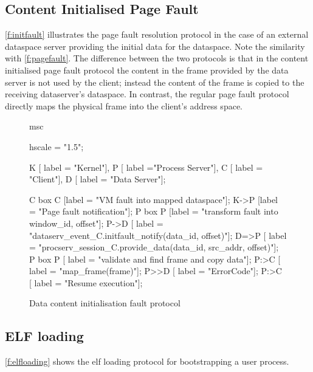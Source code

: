 \clearpage
\subsection{Content Initialised Page Fault}

\autoref{f:initfault} illustrates the page fault resolution protocol in the case of an external dataspace server providing the initial data for the dataspace. Note the similarity with \autoref{f:pagefault}. The difference between the two protocols is that in the content initialised page fault protocol the content in the frame provided by the data server is not used by the client; instead the content of the frame is copied to the receiving dataserver's dataspace. In contrast, the regular page fault protocol directly maps the physical frame into the client's address space.

\begin{figure}[htb]
  \begin{center}
    \begin{msc}
      msc {
        hscale = "1.5";
        
        K [ label = "Kernel"],
        P [ label ="Process Server"],
        C [ label = "Client"],
        D [ label = "Data Server"];
        
        C box C [label = "VM fault into mapped dataspace"];
        K->P [label = "Page fault notification"];
        P box P [label = "transform fault into window\_id, offset"];
        P->D [ label = "dataserv\_event\_C.initfault\_notify(data\_id, offset)"];
        D=>P [ label = "procserv\_session\_C.provide\_data(data\_id, src\_addr, offset)"];
        P box P [ label = "validate and find frame and copy data"];
        P:>C [ label = "map\_frame(frame)"];
        P>>D [ label = "ErrorCode"];
        P:>C [ label = "Resume execution"];
      }
    \end{msc}
  \end{center}
  \caption{Data content initialisation fault protocol}
  \label{f:initfault}
\end{figure}

\subsection{ELF loading}

\autoref{f:elfloading} shows the elf loading protocol for bootstrapping a user process.

